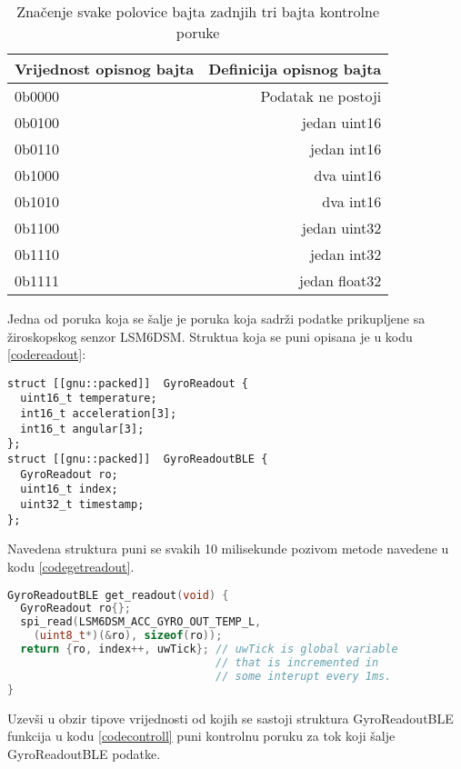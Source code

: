 \documentclass[times, utf8, diplomski]{diplomski}
\begin{document}
\begin{table}[h]
  \begin{center}
    \begin{tabular}[c]{l|r}
      \multicolumn{1}{c|}{\textbf{Vrijednost opisnog bajta}} & 
      \multicolumn{1}{c}{\textbf{Definicija opisnog bajta}} \\
      \hline
      0b0000 & Podatak ne postoji \\
      0b0100 & jedan uint16 \\
      0b0110 & jedan int16 \\
      0b1000 & dva uint16 \\
      0b1010 & dva int16 \\
      0b1100 & jedan uint32 \\
      0b1110 & jedan int32 \\
      0b1111 & jedan float32 \\
      \hline
    \end{tabular}
  \caption{Značenje svake polovice bajta zadnjih tri bajta kontrolne poruke}
  \end{center}
\end{table}

Jedna od poruka koja se šalje je poruka koja sadrži podatke prikupljene sa žiroskopskog senzor LSM6DSM. Struktua koja se puni opisana je u kodu \ref{codereadout}:

\begin{lstlisting}[caption = {Definicija strukure koja se šalje bluetoothom}, label={codereadout}]
 struct [[gnu::packed]]  GyroReadout {
  uint16_t temperature;
  int16_t acceleration[3];
  int16_t angular[3];
};
struct [[gnu::packed]]  GyroReadoutBLE {
  GyroReadout ro;
  uint16_t index;
  uint32_t timestamp;
};
\end{lstlisting}

Navedena struktura puni se svakih 10 milisekunde pozivom metode navedene u kodu \ref{codegetreadout}.

\begin{lstlisting}[language=c++, caption={Dohvaćanje očitanja s LSM6DSM senzora}, label={codegetreadout}]
GyroReadoutBLE get_readout(void) {
  GyroReadout ro{};
  spi_read(LSM6DSM_ACC_GYRO_OUT_TEMP_L,
    (uint8_t*)(&ro), sizeof(ro));
  return {ro, index++, uwTick}; // uwTick is global variable
                                // that is incremented in 
                                // some interupt every 1ms.
}
\end{lstlisting}

Uzevši u obzir tipove vrijednosti od kojih se sastoji struktura GyroReadoutBLE funkcija u kodu \ref{codecontroll} puni kontrolnu poruku za tok koji šalje GyroReadoutBLE podatke.
\end{document}
